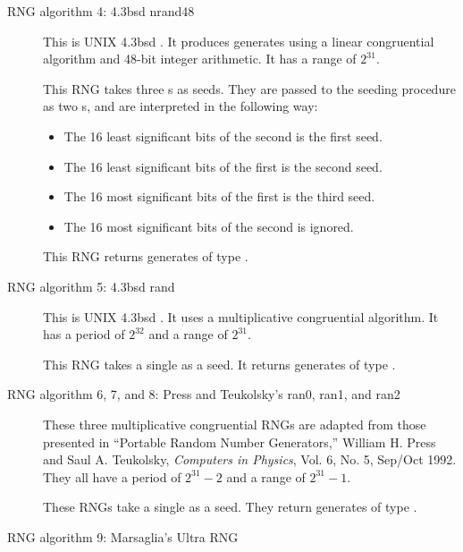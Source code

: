 \begin{description}
\item[RNG algorithm 4: 4.3bsd nrand48]
\begin{tex}
This is UNIX 4.3bsd .  It produces generates using a
linear congruential algorithm and 48-bit integer arithmetic.  It has a
range of $2^{31}$.
\end{tex}

This RNG takes three s as seeds.  They are passed
to the seeding procedure as two s, and are interpreted in the
following way:
\begin{itemize}
\item The 16 least significant bits of the second  is the
first seed.
\item The 16 least significant bits of the first  is the
second seed.
\item The 16 most significant bits of the first  is the third
seed.
\item The 16 most significant bits of the second  is
ignored.
\end{itemize}
This RNG returns generates of type .

\item[RNG algorithm 5: 4.3bsd rand]
\begin{tex}
This is UNIX 4.3bsd .  It uses a multiplicative congruential
algorithm.  It has a period of $2^{32}$ and a range of $2^{31}$.
\end{tex}

This RNG takes a single  as a seed.  It returns generates of
type .

\item[RNG algorithm 6, 7, and 8: Press and Teukolsky's ran0, ran1, and
ran2]
\begin{tex}
These three multiplicative congruential RNGs are adapted from those
presented in ``Portable Random Number Generators,'' William H.  Press
and Saul A. Teukolsky, {\em Computers in Physics}, Vol. 6, No. 5,
Sep/Oct 1992.  They all have a period of $2^{31}-2$ and a range of
$2^{31}-1$.
\end{tex}
These RNGs take a single  as a seed.  They return generates
of type .
 
\item[RNG algorithm 9: Marsaglia's Ultra RNG]
\begin{tex}


\end{tex}
\end{description}
